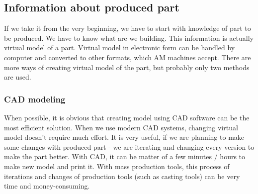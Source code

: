 \documentclass[a4paper, twoside, 11pt]{report}
\begin{document}
\subsection{Information about produced part}
If we take it from the very beginning, we have to start with knowledge of part to be produced. We have to know what are we building. This information is actually virtual model of a part. Virtual model in electronic form can be handled by computer and converted to other formats, which AM machines accept. There are more ways of creating virtual model of the part, but probably only two methods are used.
\subsubsection{CAD modeling}
When possible, it is obvious that creating model using CAD software can be the most efficient solution. When we use modern CAD systems, changing virtual model doesn't require much effort. It is very useful, if we are planning to make some changes with produced part - we are iterating and changing every version to make the part better. With CAD, it can be matter of a few minutes / hours to make new model and print it. With mass production tools, this process of iterations and changes of production tools (such as casting tools) can be very time and money-consuming.
\end{document}
